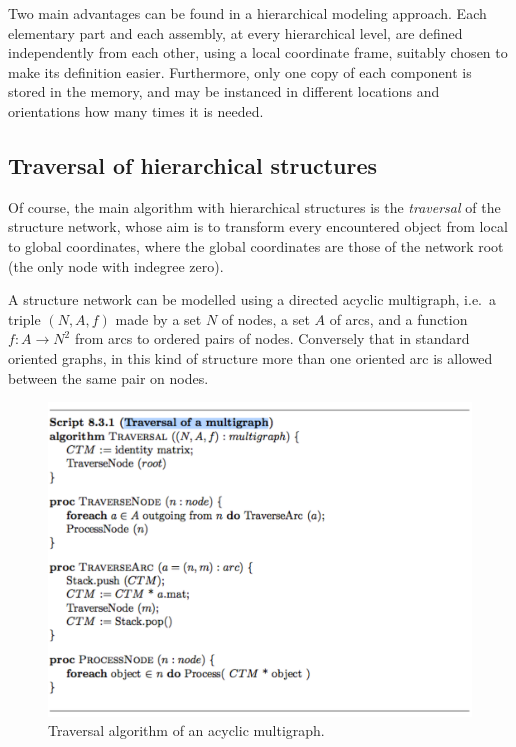 \documentclass[11pt,oneside]{article}    %
\begin{document}
Two main advantages can be found in a hierarchical modeling approach. Each elementary part and each assembly, at every hierarchical level, are defined independently from each other, using a local coordinate frame, suitably chosen to make its definition easier. Furthermore, only one copy of each component is stored in the memory, and may be instanced in different locations and orientations how many times it is needed.

\subsection{Traversal of hierarchical structures}

Of course, the main algorithm with hierarchical structures is the \emph{traversal} of the structure network, whose aim is to transform every encountered object from local to global coordinates, where the global coordinates are those of the network root (the only node with indegree zero).

A structure network can be modelled using a directed acyclic multigraph, i.e.~a triple $(N,A,f)$
made by a set $N$ of nodes, a set $A$ of arcs, and a function $f:A \to N^2$ from arcs to ordered pairs of nodes. Conversely that in standard oriented graphs, in this kind of structure more than one oriented arc is allowed between the same pair on nodes.

\begin{figure}[htbp] %
   \centering
   \includegraphics[width=0.8\linewidth]{images/traversal} 
   \caption{Traversal algorithm of an acyclic multigraph.}
   \label{fig:traversal}
\end{figure}
\end{document}
